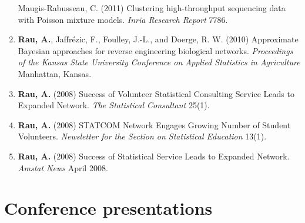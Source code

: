 \documentclass[11pt, a4paper]{awesome-cv}
\begin{document}
\begin{enumerate}
  Maugis-Rabusseau, C. (2011) Clustering high-throughput sequencing data
  with Poisson mixture models. \emph{Inria Research Report} 7786.
\item
  \textbf{Rau, A.}, Jaffrézic, F., Foulley, J.-L., and Doerge, R. W.
  (2010) Approximate Bayesian approaches for reverse engineering
  biological networks. \emph{Proceedings of the Kansas State University
  Conference on Applied Statistics in Agriculture} Manhattan, Kansas.
\item
  \textbf{Rau, A.} (2008) Success of Volunteer Statistical Consulting
  Service Leads to Expanded Network. \emph{The Statistical Consultant}
  25(1).
\item
  \textbf{Rau, A.} (2008) STATCOM Network Engages Growing Number of
  Student Volunteers. \emph{Newsletter for the Section on Statistical
  Education} 13(1).
\item
  \textbf{Rau, A.} (2008) Success of Statistical Service Leads to
  Expanded Network. \emph{Amstat News} April 2008.
\end{enumerate}

\hypertarget{conference-presentations}{%
\section{Conference presentations}\label{conference-presentations}}
\end{document}
